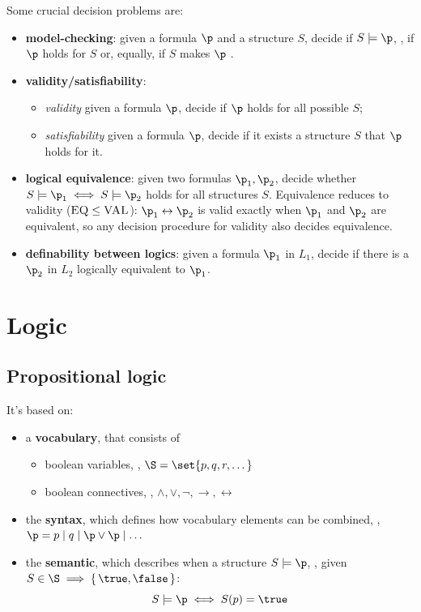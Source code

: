 \documentclass[oneside]{academica}
\begin{document}
Some crucial decision problems are:
\begin{itemize}
  \item \textbf{model-checking}: given a formula $\p$ and a structure $S$, decide if $S \models \p$, \ie, if $\p$ holds for $S$ or, equally, if $S$ makes $\p$ \true.
  \item \textbf{validity/satisfiability}:
    \begin{itemize}
      \item[] \textit{validity} \quad given a formula $\p$, decide if $\p$ holds for all possible $S$;
      \item[] \textit{satisfiability} \quad given a formula $\p$, decide if it exists a structure $S$ that $\p$ holds for it.
    \end{itemize}
  \item \textbf{logical equivalence}: given two formulas $\p_1, \p_2$, decide whether $S \models \p_1 \iff S \models \p_2$ holds for all structures $S$. Equivalence reduces to validity ($\textsc{EQ} \le \textsc{VAL}$): $\p_1 \leftrightarrow \p_2$ is valid exactly when $\p_1$ and $\p_2$ are equivalent, so any decision procedure for validity also decides equivalence.
  \item \textbf{definability between logics}: given a formula $\p_1$ in $L_1$, decide if there is a $\p_2$ in $L_2$ logically equivalent to $\p_1$.
\end{itemize}

\newpage

\section{Logic}

\subsection{Propositional logic}

It's based on:
\begin{itemize}
  \item a \textbf{vocabulary}, that consists of 
    \begin{itemize}
      \item[] boolean variables, \eg, $\S = \set{p,q,r,\dots}$
      \item[] boolean connectives, \eg, $\land,\lor,\neg,\to,\leftrightarrow$
    \end{itemize}
  \item the \textbf{syntax}, which defines how vocabulary elements can be combined, \eg, $\p = p \mid q \mid \p \lor \p \mid \dots$
  \item the \textbf{semantic}, which describes when a structure $S \models \p$, \eg, given $S \in \S \implies \{\,\true,\allowbreak \false\,\}$:
    \begin{equation*}
      S \models \p \iff S(p) = \true
    \end{equation*}
\end{itemize}
\end{document}
